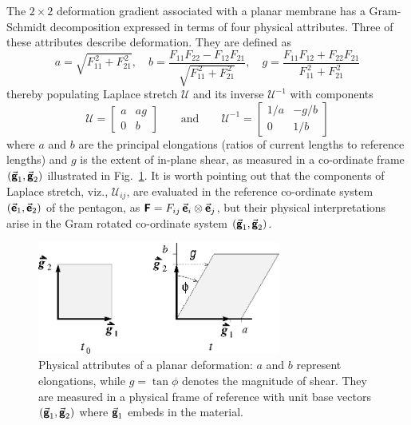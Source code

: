 The $2 \times 2$ deformation gradient associated with a planar membrane has a Gram-Schmidt decomposition expressed in terms of four physical attributes.  Three of these attributes describe deformation.  They are defined as \cite{Freedetal17}
\begin{equation}
a = \sqrt{F_{11}^{\,2} + F_{21}^{\,2}} , \quad
b = \frac{F_{11} F_{22} - F_{12} F_{21}}
{\sqrt{F_{11}^{\,2} + F_{21}^{\,2}}} , \quad
g = \frac{F_{11} F_{12} +  F_{22} F_{21}}
{F_{11}^{\,2} + F_{21}^{\,2}} 
\label{physicalVariables}
\end{equation}
thereby populating Laplace stretch $\boldsymbol{\mathcal{U}}$ and its inverse $\boldsymbol{\mathcal{U}}^{-1}$ with components
\begin{equation}
\boldsymbol{\mathcal{U}} = \begin{bmatrix}
a & a g \\ 0 & b
\end{bmatrix} \qquad \text{and} \qquad
\boldsymbol{\mathcal{U}}^{-1} = \begin{bmatrix} 
1 / a & -g / b \\ 0 & 1 / b
\end{bmatrix}
\label{LaplaceStretch2D}
\end{equation}
where $a$ and $b$ are the principal elongations (ratios of current lengths to reference lengths) and $g$ is the extent of in-plane shear, as measured in a co-ordinate frame $(  \vec{\boldsymbol{\mathsf{g}}}_1 , \vec{\boldsymbol{\mathsf{g}}}_2 )$ illustrated in Fig.~\ref{figKinematics}.  It is worth pointing out that the components of Laplace stretch, viz., $\mathcal{U}_{ij}$, are evaluated in the reference co-ordinate system $( \vec{\boldsymbol{\mathsf{e}}}_1 , \vec{\boldsymbol{\mathsf{e}}}_2 )$ of the pentagon, as $\boldsymbol{\mathsf{F}} = F_{ij} \, \vec{\boldsymbol{\mathsf{e}}}_i \otimes \vec{\boldsymbol{\mathsf{e}}}_j$, but their physical interpretations arise in the Gram rotated co-ordinate system $( \vec{\boldsymbol{\mathsf{g}}}_1 , \vec{\boldsymbol{\mathsf{g}}}_2 )$.

\begin{figure}
	\centering
	\includegraphics[width=8cm]{figures/deformation.png}
	\caption{Physical attributes of a planar deformation: $a$ and $b$ represent elongations, while $g = \tan \phi$ denotes the magnitude of shear.  They are measured in a physical frame of reference with unit base vectors $( \vec{\boldsymbol{\mathsf{g}}}_1 , \vec{\boldsymbol{\mathsf{g}}}_2 )$ where $\vec{\boldsymbol{\mathsf{g}}}_1$ embeds in the material.}
	\label{figKinematics}
\end{figure}

